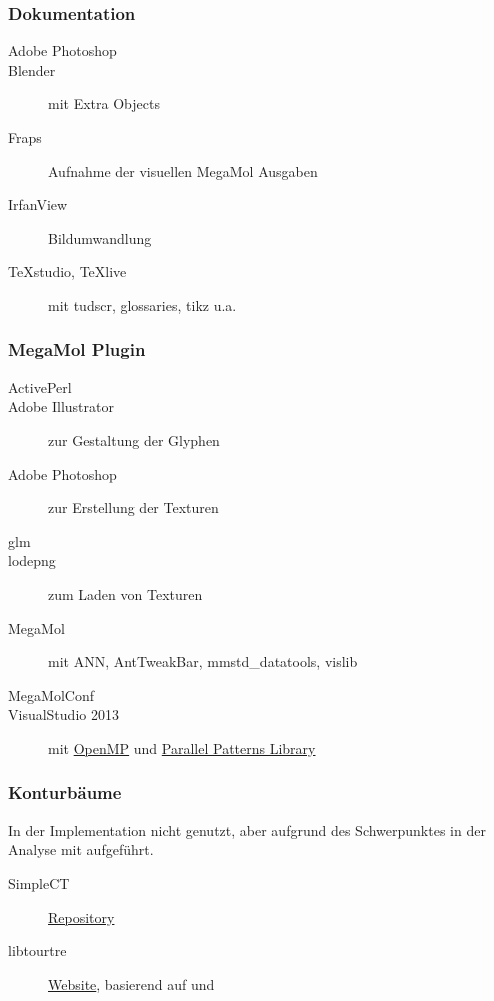 \subsubsection{Dokumentation}
\begin{description}
	\item [Adobe Photoshop]
	\item [Blender] mit Extra Objects
	\item [Fraps] Aufnahme der visuellen MegaMol Ausgaben
	\item [IrfanView] Bildumwandlung
	\item [TeXstudio, TeXlive] mit tudscr, glossaries, tikz u.a.
\end{description}

\subsubsection{MegaMol Plugin}
\begin{description}
	\item [ActivePerl]
	\item [Adobe Illustrator] zur Gestaltung der Glyphen
	\item [Adobe Photoshop] zur Erstellung der Texturen
	\item [glm]
	\item [lodepng] zum Laden von Texturen
	\item [MegaMol] mit ANN, AntTweakBar, mmstd\_datatools, vislib
	\item [MegaMolConf]
	\item [VisualStudio 2013] mit \href{http://openmp.org/}{OpenMP} und \href{https://msdn.microsoft.com/en-us/library/dd492418.aspx}{Parallel Patterns Library}
\end{description}

\subsubsection{Konturbäume}
In der Implementation nicht genutzt, aber aufgrund des Schwerpunktes in der Analyse mit aufgeführt.
\begin{description}
	\item [SimpleCT]  \href{https://github.com/baranaydogan/SimpleCT/}{Repository} \cite{aydogan2013contourTreeBinary}
	\item [libtourtre] \href{http://graphics.cs.ucdavis.edu/~sdillard/libtourtre/doc/html/}{Website}, basierend auf \cite{carr2001computingCountourTrees} und \cite{pascucci2004multiResolutionComputation}
\end{description}

